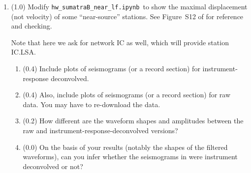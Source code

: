 \documentclass[11pt,titlepage,fleqn]{article}
\newcommand{\tfilenearlf}{{\tt hw\_sumatraB\_near\_lf.ipynb}}
\begin{document}
\begin{enumerate}
\item (1.0) Modify \tfilenearlf\ to show the maximal displacement (not velocity) of some ``near-source'' stations. See Figure~S12 of \citet{Ammon2005} for reference and checking.

Note that here we ask for network IC as well, which will provide station IC.LSA.

%
\begin{enumerate}
\item (0.4) Include plots of seismograms (or a record section) for instrument-response deconvolved.

\item (0.4) Also, include plots of seismograms (or a record section) for raw data. You may have to re-download the data.

\item (0.2) How different are the waveform shapes and amplitudes between the raw and instrument-response-deconvolved versions?

\item (0.0) On the basis of your results (notably the shapes of the filtered waveforms), can you infer whether the seismograms in \citet{Ammon2005} were instrument deconvolved or not?
\end{enumerate}
%
\iffalse
Notes:
%
\begin{itemize}
\item Note: Let us assume that \citet{Ammon2005} used the label H1 to denote the E channel (nominally east) and H2 to denote the N channel (nominally north).

\item Make sure you are looking at displacement, not velocity.

\end{itemize}
\fi



\end{enumerate}
\end{document}
